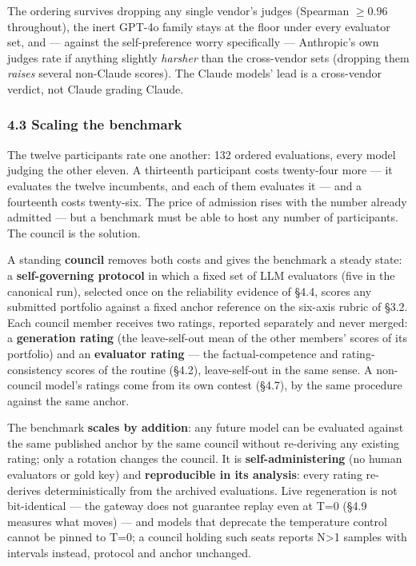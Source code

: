 The ordering survives dropping any single vendor's judges (Spearman \(\ge 0.96\) throughout), the inert GPT-4o family stays at the floor under every evaluator set, and --- against the self-preference worry specifically --- Anthropic's own judges rate if anything slightly \emph{harsher} than the cross-vendor sets (dropping them \emph{raises} several non-Claude scores). The Claude models' lead is a cross-vendor verdict, not Claude grading Claude.

\subsubsection{4.3 Scaling the benchmark}\label{scaling-the-benchmark}

The twelve participants rate one another: 132 ordered evaluations, every model judging the other eleven. A thirteenth participant costs twenty-four more --- it evaluates the twelve incumbents, and each of them evaluates it --- and a fourteenth costs twenty-six. The price of admission rises with the number already admitted --- but a benchmark must be able to host any number of participants. The council is the solution.

A standing \textbf{council} removes both costs and gives the benchmark a steady state: a \textbf{self-governing protocol} in which a fixed set of LLM evaluators (five in the canonical run), selected once on the reliability evidence of §4.4, scores any submitted portfolio against a fixed anchor reference on the six-axis rubric of §3.2. Each council member receives two ratings, reported separately and never merged: a \textbf{generation rating} (the leave-self-out mean of the other members' scores of its portfolio) and an \textbf{evaluator rating} --- the factual-competence and rating-consistency scores of the routine (§4.2), leave-self-out in the same sense. A non-council model's ratings come from its own contest (§4.7), by the same procedure against the same anchor.

The benchmark \textbf{scales by addition}: any future model can be evaluated against the same published anchor by the same council without re-deriving any existing rating; only a rotation changes the council. It is \textbf{self-administering} (no human evaluators or gold key) and \textbf{reproducible in its analysis}: every rating re-derives deterministically from the archived evaluations. Live regeneration is not bit-identical --- the gateway does not guarantee replay even at T=0 (§4.9 measures what moves) --- and models that deprecate the temperature control cannot be pinned to T=0; a council holding such seats reports N\textgreater1 samples with intervals instead, protocol and anchor unchanged.

